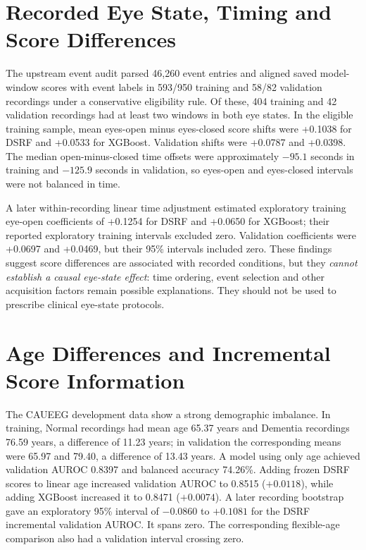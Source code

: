 \section{Recorded Eye State, Timing and Score Differences}
The upstream event audit parsed 46,260 event entries and aligned saved model-window scores with event labels in 593/950 training and 58/82 validation recordings under a conservative eligibility rule. Of these, 404 training and 42 validation recordings had at least two windows in both eye states. In the eligible training sample, mean eyes-open minus eyes-closed score shifts were +0.1038 for DSRF and +0.0533 for XGBoost. Validation shifts were +0.0787 and +0.0398. The median open-minus-closed time offsets were approximately $-95.1$ seconds in training and $-125.9$ seconds in validation, so eyes-open and eyes-closed intervals were not balanced in time.

A later within-recording linear time adjustment estimated exploratory training eye-open coefficients of +0.1254 for DSRF and +0.0650 for XGBoost; their reported exploratory training intervals excluded zero. Validation coefficients were +0.0697 and +0.0469, but their 95\% intervals included zero. These findings suggest score differences are associated with recorded conditions, but they \emph{cannot establish a causal eye-state effect}: time ordering, event selection and other acquisition factors remain possible explanations. They should not be used to prescribe clinical eye-state protocols.


\section{Age Differences and Incremental Score Information}
The CAUEEG development data show a strong demographic imbalance. In training, Normal recordings had mean age 65.37 years and Dementia recordings 76.59 years, a difference of 11.23 years; in validation the corresponding means were 65.97 and 79.40, a difference of 13.43 years. A model using only age achieved validation AUROC 0.8397 and balanced accuracy 74.26\%. Adding frozen DSRF scores to linear age increased validation AUROC to 0.8515 ($+0.0118$), while adding XGBoost increased it to 0.8471 ($+0.0074$). A later recording bootstrap gave an exploratory 95\% interval of $-0.0860$ to $+0.1081$ for the DSRF incremental validation AUROC. It spans zero. The corresponding flexible-age comparison also had a validation interval crossing zero.

